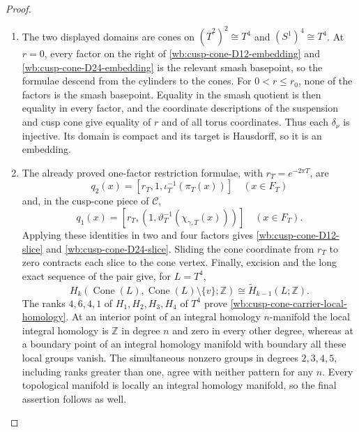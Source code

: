 \begin{proof}
\begin{enumerate}[label=\arabic*.,leftmargin=*]
\item The two displayed domains are cones on
\((\overline T^2)^2\cong T^4\) and \((S^1)^4\cong T^4\).  At \(r=0\),
every factor on the right of
\cref{wb:cusp-cone-D12-embedding} and \cref{wb:cusp-cone-D24-embedding} is the relevant
smash basepoint, so the formulae descend from the cylinders to the cones.
For \(0<r\leq r_0\), none of the factors is the smash basepoint.  Equality
in the smash quotient is then equality in every factor, and the coordinate
descriptions of the suspension and cusp cone give equality of \(r\) and of
all torus coordinates.  Thus each \(\delta_\nu\) is injective.  Its domain
is compact and its target is Hausdorff, so it is an embedding.

\item The already proved one-factor restriction formulae, with
\(r_T=e^{-2\pi T}\), are
\[
 q_2(x)=[r_T,1,\iota_T^{-1}(\pi_T(x))]
 \quad(x\in F_T)
\]
and, in the cusp-cone piece of \(\mathcal C\),
\[
 q_1(x)
 =[r_T,(1,\vartheta_T^{-1}(\chi_{\gamma,T}(x)))]
 \quad(x\in F_T).
\]
Applying these identities in two and four factors gives
\cref{wb:cusp-cone-D12-slice} and \cref{wb:cusp-cone-D24-slice}.  Sliding the cone coordinate
from \(r_T\) to zero contracts each slice to the cone vertex.  Finally,
excision and the long exact sequence of the pair give, for \(L=T^4\),
\[
 H_k(\operatorname{Cone}(L),
     \operatorname{Cone}(L)\setminus\{v\};\mathbb Z)
 \cong\widetilde H_{k-1}(L;\mathbb Z).
\]
The ranks \(4,6,4,1\) of \(H_1,H_2,H_3,H_4\) of \(T^4\) prove
\cref{wb:cusp-cone-carrier-local-homology}.  At an interior point of an
integral homology \(n\)-manifold the local integral homology is \(\mathbb Z\)
in degree \(n\) and zero in every other degree, whereas at a boundary point
of an integral homology manifold with boundary all these local groups
vanish.  The simultaneous nonzero groups in degrees \(2,3,4,5\), including
ranks greater than one, agree with neither pattern for any \(n\).  Every
topological manifold is locally an integral homology manifold, so the final
assertion follows as well.
\end{enumerate}
\end{proof}

